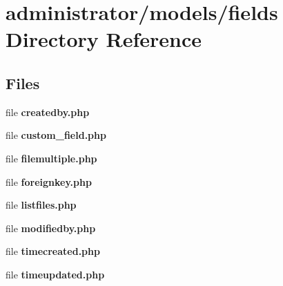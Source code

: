 \section{administrator/models/fields Directory Reference}
\label{dir_1eb06c33a0f0ce72907208da450dbdea}
\subsection*{Files}
\begin{DoxyCompactItemize}
\item 
file \textbf{ createdby.\+php}
\item 
file \textbf{ custom\+\_\+field.\+php}
\item 
file \textbf{ filemultiple.\+php}
\item 
file \textbf{ foreignkey.\+php}
\item 
file \textbf{ listfiles.\+php}
\item 
file \textbf{ modifiedby.\+php}
\item 
file \textbf{ timecreated.\+php}
\item 
file \textbf{ timeupdated.\+php}
\end{DoxyCompactItemize}
